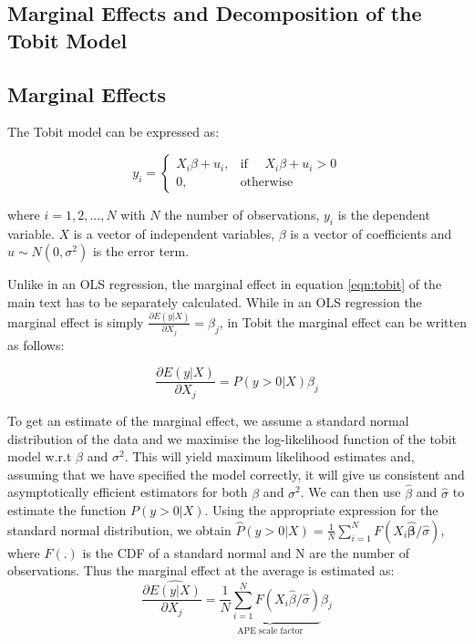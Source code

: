 \documentclass[11pt, oneside]{article}
\begin{document}
	
	\newpage
	\begin{appendices}
		
		\section{ Marginal Effects  and Decomposition of the Tobit Model}
		\setcounter{equation}{0}
		\label{app:TobitDecomp}
		
	   \subsection{ Marginal Effects}
		The Tobit model can be expressed as:
		
		\begin{equation*}
		y_i= 
		\begin{cases}
		X_i \beta  + u_i ,& \text{if } \quad X_i \beta  + u_i >0\\
		0,              & \text{otherwise}
		\end{cases}
		\end{equation*}
		
		where $i=1,2,...,N$ with $N$ the number of observations, $y_i$ is the dependent variable. $X$ is a vector of independent variables, $\beta$ is a vector of coefficients and $u \sim N(0,\sigma^2)$ is the error term. 
		
			Unlike in an OLS regression, the marginal effect in equation \ref{eqn:tobit} of the main text has to be separately calculated. While in an OLS regression the marginal effect is simply $\frac{\partial E(y|X)}{\partial X_{j}}=\beta_j$, in Tobit the marginal effect can be written as follows:
		
		\begin{equation}
		\label{eqn:tobit_marginal}
		\frac{\partial E(y| X)}{\partial X_j} = P(y>0|X) \beta_j
		\end{equation}
		
		
		\noindent To get an estimate of the marginal effect, we assume a standard normal distribution of the data and we maximise the log-likelihood function of the tobit model w.r.t $\beta$ and $\sigma^2$. This will yield maximum likelihood estimates and, assuming that we have specified the model correctly, it will give us consistent and asymptotically efficient estimators for both $\beta$ and $\sigma^2$. We can then use $\hat{\beta}$ and $\hat{\sigma}$ to estimate the function $P(y>0|X)$. Using the appropriate expression for the standard normal distribution, we obtain $\hat{P}(y>0|X)=\frac{1}{N} \sum_{i=1}^N F(X_i \hat{\boldsymbol{\beta}}/ \hat{\sigma})$, where $F(.)$ is the CDF of a standard normal and N are the number of observations. Thus the marginal effect at the average is estimated as:
		\[
		\frac{\partial \widehat{E(y|X)}}{\partial X_j} = \underbrace{\frac{1}{N} \sum_{i=1}^N F(X_{i} \hat{\beta}/ \hat{\sigma})}_\text{APE scale factor} \hat \beta_j
		\]
		

\end{appendices}
\end{document}
